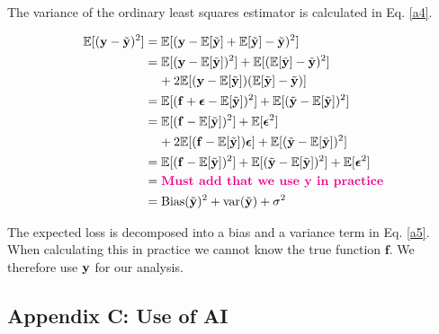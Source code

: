The variance of the ordinary least squares estimator is calculated in Eq. \ref{a4}. 

\begin{align}\label{a5}
    \mathbb{E}[(\mathbf{y}-\Tilde{\mathbf{y}})^2] & = \mathbb{E}[(\mathbf{y} - \mathbb{E}[\Tilde{\mathbf{y}}] + \mathbb{E}[\Tilde{\mathbf{y}}] -\Tilde{\mathbf{y}})^2] \nonumber \\
    & = \mathbb{E}[(\mathbf{y} - \mathbb{E}[\Tilde{\mathbf{y}}])^2] + \mathbb{E}[(\mathbb{E}[\Tilde{\mathbf{y}}] -\Tilde{\mathbf{y}})^2] \nonumber \\
    & \;\;\;\; + 2\mathbb{E}[(\mathbf{y} - \mathbb{E}[\Tilde{\mathbf{y}}])(\mathbb{E}[\Tilde{\mathbf{y}}] -\Tilde{\mathbf{y}})] \nonumber \\
    & = \mathbb{E}[(\mathbf{f} + \boldsymbol{\epsilon} - \mathbb{E}[\Tilde{\mathbf{y}}])^2] + \mathbb{E}[(\Tilde{\mathbf{y}} - \mathbb{E}[\Tilde{\mathbf{y}}])^2] \nonumber \\
    & = \mathbb{E}[(\mathbf{f}-\mathbb{E}[\Tilde{\mathbf{y}}])^2]+\mathbb{E}[\boldsymbol{\epsilon}^2] \nonumber \\
    & \;\;\;\; + 2\mathbb{E}[(\mathbf{f}-\mathbb{E}[\Tilde{\mathbf{y}}])\boldsymbol{\epsilon}] + \mathbb{E}[(\Tilde{\mathbf{y}} - \mathbb{E}[\Tilde{\mathbf{y}}])^2]  \nonumber \\
    & = \mathbb{E}[(\mathbf{f}-\mathbb{E}[\Tilde{\mathbf{y}}])^2] + \mathbb{E}[(\Tilde{\mathbf{y}} - \mathbb{E}[\Tilde{\mathbf{y}}])^2] +\mathbb{E}[\boldsymbol{\epsilon}^2]\nonumber \\
    & = \textbf{\color{magenta}{Must add that we use y in practice}} \nonumber \\
    & = \text{Bias}(\Tilde{\mathbf{y}})^2 + \text{var}(\Tilde{\mathbf{y}}) + \sigma^2
\end{align}

The expected loss  is decomposed into a bias and a variance term in Eq. \ref{a5}. When calculating this in practice we cannot know the true function $\boldsymbol{f}$. We therefore use $\mathbf{y}$ for our analysis. 






\subsection{Appendix C: Use of AI} \label{appendixC}

